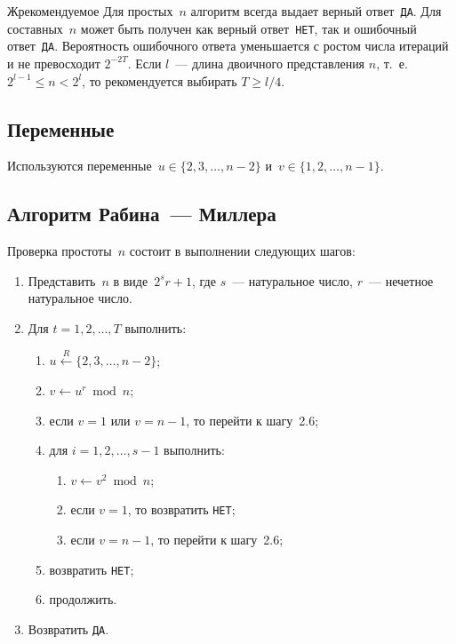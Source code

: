\begin{appendix}{Ж}{рекомендуемое}
Для простых~$n$ алгоритм всегда выдает верный ответ~\texttt{ДА}. 
%
Для составных~$n$ может быть получен как верный ответ~\texttt{НЕТ},
так и ошибочный ответ~\texttt{ДА}. 
Вероятность ошибочного ответа уменьшается с ростом числа итераций
и не превосходит $2^{-2T}$.
Если $l$~--- длина двоичного представления $n$, т.~е. $2^{l-1}\leq n<2^l$,
то рекомендуется выбирать $T\geq l/4$.

\subsection{Переменные}\label{NT.PrimeQ.Vars}

Используются переменные~$u\in\{2,3,\ldots,n-2\}$
и~$v\in\{1,2,\ldots,n-1\}$.

\subsection{Алгоритм Рабина~--- Миллера}\label{NT.PrimeQ.Alg}

Проверка простоты~$n$ состоит в выполнении следующих шагов:
\begin{enumerate}
\item
Представить~$n$ в виде~$2^s r + 1$,
где $s$~--- натуральное число, $r$~--- нечетное натуральное число.

\item
Для $t=1,2,\ldots,T$ выполнить:
\begin{enumerate}
\item
$u\stackrel{R}{\leftarrow}\{2,3,\ldots,n-2\}$;
\item
$v\leftarrow u^r \bmod n$;
\item
если $v=1$ или $v=n-1$, то перейти к шагу~2.6;
\item
для $i=1,2,\ldots,s-1$ выполнить:
\begin{enumerate}
\item
$v\leftarrow v^2\bmod n$;
\item
если $v=1$, то возвратить \texttt{НЕТ};
\item
если $v=n-1$, то перейти к шагу~2.6;
\end{enumerate}
\item
возвратить \texttt{НЕТ};
\item
продолжить.
\end{enumerate}
\item
Возвратить \texttt{ДА}.
\end{enumerate}

\label{NT.Legendre}


\end{appendix}
